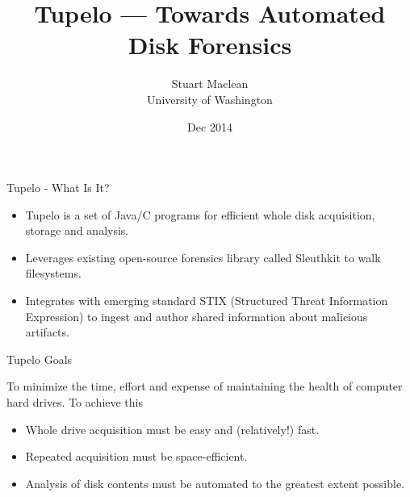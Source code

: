 \documentclass{beamer}
\title[Tupelo] %
{Tupelo --- Towards Automated Disk Forensics}
\author[] %
{Stuart Maclean \\
University of Washington}
\date[] %
{Dec 2014}
\begin{document}

\begin{frame}
  \titlepage
\end{frame}




\begin{frame}{Tupelo - What Is It?}

\begin{itemize}
\item Tupelo is a set of Java/C programs for efficient whole disk
  acquisition, storage and analysis.

\item Leverages existing open-source forensics library called
  Sleuthkit to walk filesystems.

\item Integrates with emerging standard STIX (Structured
  Threat Information Expression) to ingest and
  author shared information about malicious artifacts.

\end{itemize}

\end{frame}



\begin{frame}{Tupelo Goals}

To minimize the time, effort and expense of maintaining the health of
computer hard drives.  To achieve this

\begin{itemize}

\item Whole drive acquisition must be easy and (relatively!) fast.

\item Repeated acquisition must be space-efficient.

\item Analysis of disk contents must be automated to the greatest
  extent possible.

\end{itemize}

\end{frame}
\end{document}
